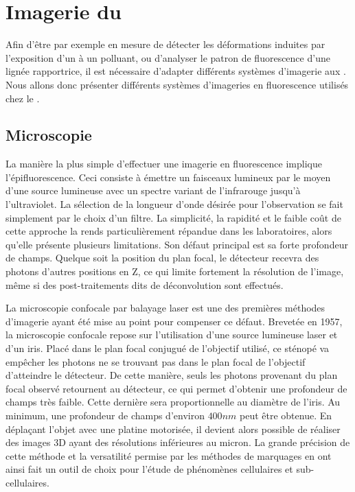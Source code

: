 \documentclass[\main/main.tex]{subfiles}
\begin{document}
            
\section{Imagerie du \pz{}}

\label{sec:imagerie}

Afin d'être par exemple en mesure de détecter les déformations induites par l'exposition d'un \pz{} à un polluant,
ou d'analyser le patron de fluorescence d'une lignée rapportrice,
il est nécessaire d'adapter différents systèmes d'imagerie aux \pz{}.
%
Nous allons donc présenter différents systèmes d'imageries en fluorescence utilisés chez le \pz{}.

    \subsection{Microscopie}
    
La manière la plus simple d'effectuer une imagerie en fluorescence implique l'épifluorescence.
Ceci consiste à émettre un faisceaux lumineux par le moyen d'une source lumineuse avec un spectre variant de l'infrarouge jusqu'à l'ultraviolet.
%
La sélection de la longueur d'onde désirée pour l'observation se fait simplement par le choix d'un filtre.
%
La simplicité, la rapidité et le faible coût de cette approche la rends particulièrement répandue dans les laboratoires, alors qu'elle présente plusieurs limitations.
%
Son défaut principal est sa forte profondeur de champs.
%
Quelque soit la position du plan focal, le détecteur recevra des photons d'autres positions en Z, ce qui limite fortement la résolution de l'image, même si des post-traitements dits de déconvolution sont effectués.


%
La microscopie confocale par balayage laser est une des premières méthodes d'imagerie ayant été mise au point pour compenser ce défaut. 
%
Brevetée en 1957, la microscopie confocale repose sur l'utilisation d'une source lumineuse laser et d'un iris.
%
Placé dans le plan focal conjugué de l'objectif utilisé, ce sténopé va empêcher les photons ne se trouvant pas dans le plan focal de l'objectif d'atteindre le détecteur.
%
De cette manière, seuls les photons provenant du plan focal observé retournent au détecteur, ce qui permet d'obtenir une profondeur de champs très faible.
%
Cette dernière sera proportionnelle au diamètre de l'iris. Au minimum, une profondeur de champs d'environ $400 nm$ peut être obtenue.
%
En déplaçant l'objet avec une platine motorisée, il devient alors possible de réaliser des images 3D ayant des résolutions inférieures au micron.
%
La grande précision de cette méthode et la versatilité permise par les méthodes de marquages en ont ainsi fait un outil de choix pour l'étude de phénomènes cellulaires et sub-cellulaires.
\end{document}

